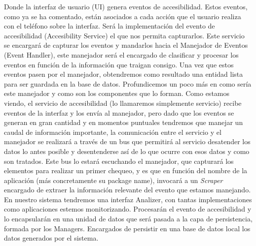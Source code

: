 \documentclass[12pt,a4paper,oneside]{book} %
\begin{document}
Donde la interfaz de usuario (UI) genera eventos de accesibilidad. Estos eventos, como ya se ha comentado, están asociados a cada acción que el usuario realiza con el teléfono sobre la interfaz. Será la implementación del evento de accesibilidad (Accesibility Service) el que nos permita capturarlos. 
\newline
\newline
Este servicio se encargará de capturar los eventos y mandarlos hacia el Manejador de Eventos (Event Handler), este manejador será el encargado de clasificar y procesar los eventos en función de la información que traigan consigo. 
\newline
\newline
Una vez que estos eventos pasen por el manejador, obtendremos como resultado una entidad lista para ser guardada en la base de datos. 
\newline
\newline
Profundicemos un poco más en como sería este manejador y como son los componentes que lo forman. 
\newline
\newline
Como estamos viendo, el servicio de accesibilidad (lo llamaremos simplemente servicio) recibe eventos de la interfaz y los envía al manejador, pero dado que los eventos se generan en gran cantidad y en momentos puntuales tendremos que manejar un caudal de información importante, la comunicación entre el servicio y el manejador se realizará a través de un bus que permitirá al servicio desatender los datos lo antes posible y desentenderse así de lo que ocurre con esos datos y como son tratados.
\newline
\newline
Este bus lo estará escuchando el manejador, que capturará los elementos para realizar un primer chequeo, y es que en función del nombre de la aplicación (más concretamente su package name), invocará a un \textit{Scraper} encargado de extraer la información relevante del evento que estamos manejando. 
\newline
\newline
En nuestro sistema tendremos una interfaz Analizer, con tantas implementaciones como aplicaciones estemos monitorizando. Procesarán el evento de accesibilidad y lo encapsularán en una unidad de datos que será pasada a la capa de persistencia, formada por los Managers. Encargados de persistir en una base de datos local los datos generados por el sistema. 
\newline
\newline
\end{document}
